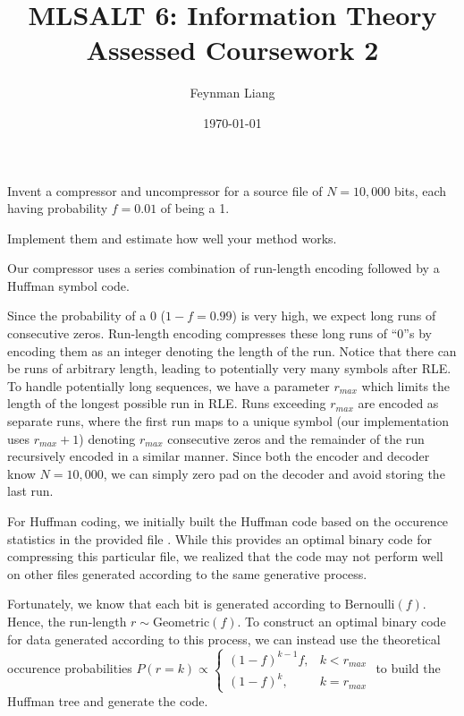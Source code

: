 \documentclass[a4paper,oneside,reqno]{hmcpset}
\newcommand{\authorname}{Feynman Liang}
\newcommand{\coursename}{MLSALT 6: Information Theory}
\newcommand{\assignmentname}{Assessed Coursework 2}
\begin{document}
\title{\coursename\\\assignmentname}
\author{\authorname}
\date{\today}


\begin{problem}
  Invent a compressor and uncompressor for a source file of $N=10,000$ bits,
  each having probability $f = 0.01$ of being a 1.

  Implement them and estimate how well your method works.
\end{problem}

\begin{solution}
  Our compressor uses a series combination of run-length encoding followed by a
  Huffman symbol code.

  Since the probability of a $0$ ($1-f = 0.99$) is very high, we expect long
  runs of consecutive zeros. Run-length encoding compresses these long runs of
  ``0''s by encoding them as an integer denoting the length of the run. Notice
  that there can be runs of arbitrary length, leading to potentially very many
  symbols after RLE. To handle potentially long sequences, we have a parameter
  $r_{max}$ which limits the length of the longest possible run in RLE. Runs
  exceeding $r_{max}$ are encoded as separate runs, where the first run
  maps to a unique symbol (our implementation uses $r_{max} +1$) denoting
  $r_{max}$ consecutive zeros and the remainder of the run recursively encoded
  in a similar manner. Since both the encoder and decoder know $N=10,000$, we
  can simply zero pad on the decoder and avoid storing the last run.

  For Huffman coding, we initially built the Huffman code based on the
  occurence statistics in the provided file .
  While this provides an optimal binary code for compressing this particular file,
  we realized that the code may not perform well on other files generated
  according to the same generative process.

  Fortunately, we know that each bit is generated according to
  $\text{Bernoulli}(f)$. Hence, the run-length $r \sim \text{Geometric}(f)$.
  To construct an optimal binary code for data generated according to this
  process, we can instead use the theoretical occurence probabilities $P(r = k) \propto \begin{cases}
    (1-f)^{k-1}f, &k < r_{max}\\
    (1-f)^{k}, &k = r_{max}
  \end{cases}$ to build the Huffman tree and generate the code.


\end{solution}
\end{document}
